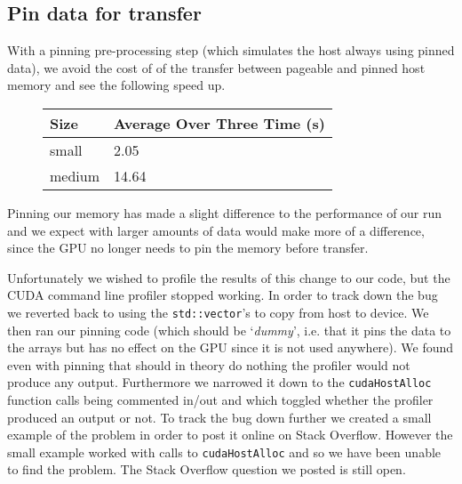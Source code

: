 \subsection{Pin data for transfer}
With a pinning pre-processing step (which simulates the host always using pinned data), we avoid the cost of of the transfer between pageable and pinned host memory and see the following speed up.
\begin{figure}[H]\centering \begin{tabular}{ l | l }
  \hline
  Size & Average Over Three Time (s) \\
  \hline
  \hline
  small & 2.05 \\
  medium & 14.64 \\
  \hline
\end{tabular} \end{figure}

Pinning our memory has made a slight difference to the performance of our run and we expect with larger amounts of data would make more of a difference, since the GPU no longer needs to pin the memory before transfer.

Unfortunately we wished to profile the results of this change to our code, but the CUDA command line profiler stopped working. In order to track down the bug we reverted back to using the \verb!std::vector!'s to copy from host to device. We then ran our pinning code (which should be `\emph{dummy}', i.e. that it pins the data to the arrays but has no effect on the GPU since it is not used anywhere). We found even with pinning that should in theory do nothing the profiler would not produce any output. Furthermore we narrowed it down to the \verb!cudaHostAlloc! function calls being commented in/out and which toggled whether the profiler produced an output or not.
To track the bug down further we created a small example of the problem in order to post it online on Stack Overflow. However the small example worked with calls to \verb!cudaHostAlloc! and so we have been unable to find the problem. The Stack Overflow question we posted is still open.\cite{so_profiler}